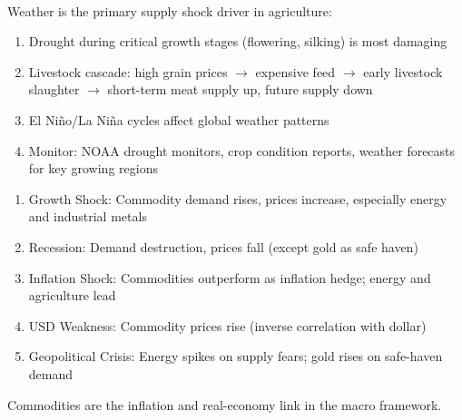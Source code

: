 \begin{remark} \\
Weather is the primary supply shock driver in agriculture:
\begin{enumerate}[label=\roman*.]
\setlength{\itemsep}{0pt}
\item Drought during critical growth stages (flowering, silking) is most damaging
\item Livestock cascade: high grain prices $\to$ expensive feed $\to$ early livestock slaughter $\to$ short-term meat supply up, future supply down
\item El Ni\~{n}o/La Ni\~{n}a cycles affect global weather patterns
\item Monitor: NOAA drought monitors, crop condition reports, weather forecasts for key growing regions
\end{enumerate}
\end{remark}

\begin{remark} 
\begin{enumerate}[label=\roman*.]
\setlength{\itemsep}{0pt}
\item Growth Shock: Commodity demand rises, prices increase, especially energy and industrial metals
\item Recession: Demand destruction, prices fall (except gold as safe haven)
\item Inflation Shock: Commodities outperform as inflation hedge; energy and agriculture lead
\item USD Weakness: Commodity prices rise (inverse correlation with dollar)
\item Geopolitical Crisis: Energy spikes on supply fears; gold rises on safe-haven demand
\end{enumerate}
Commodities are the inflation and real-economy link in the macro framework.
\end{remark}

